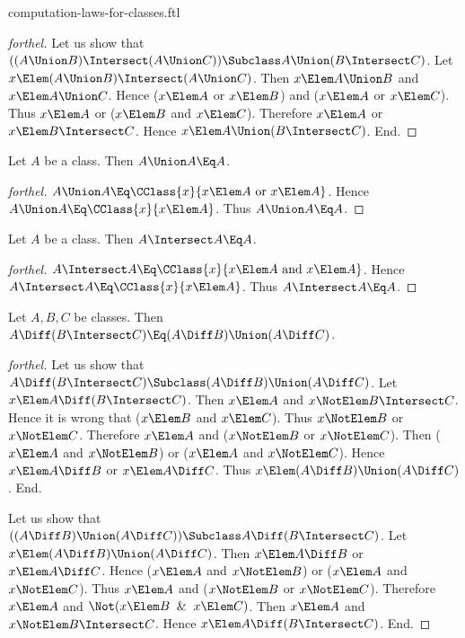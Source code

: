 \documentclass{stex}
\begin{document}
\begin{smodule}{computation-laws-for-classes.ftl}
\begin{proof}[forthel]
  Let us show that $((A \Union B) \Intersect (A \Union C)) \Subclass A \Union (B \Intersect C)$. %
    Let $x \Elem (A \Union B) \Intersect (A \Union C)$.
    Then $x \Elem A \Union B$ and $x \Elem A \Union C$.
    Hence ($x \Elem A$ or $x \Elem B$) and ($x \Elem A$ or $x \Elem C$).
    Thus $x \Elem A$ or ($x \Elem B$ and $x \Elem C$).
    Therefore $x \Elem A$ or $x \Elem B \Intersect C$.
    Hence $x \Elem A \Union (B \Intersect C)$.
  End.
\end{proof}

\begin{proposition*}[forthel]
  Let $A$ be a class.
  Then $A \Union A \Eq A$.
\end{proposition*}
\begin{proof}[forthel]
  $A \Union A \Eq \CClass{x}{x \Elem A\text{ or }x \Elem A}$.
  Hence $A \Union A \Eq \CClass{x}{x \Elem A}$.
  Thus $A \Union A \Eq A$.
\end{proof}

\begin{proposition*}[forthel]
  Let $A$ be a class.
  Then $A \Intersect A \Eq A$.
\end{proposition*}
\begin{proof}[forthel]
  $A \Intersect A \Eq \CClass{x}{x \Elem A\text{ and }x \Elem A}$.
  Hence $A \Intersect A \Eq \CClass{x}{x \Elem A}$.
  Thus $A \Intersect A \Eq A$.
\end{proof}

\begin{proposition*}[forthel]
  Let $A, B, C$ be classes.
  Then $A \Diff (B \Intersect C) \Eq (A \Diff B) \Union (A \Diff C)$.
\end{proposition*}
\begin{proof}[forthel]
  Let us show that $A \Diff (B \Intersect C) \Subclass (A \Diff B) \Union (A \Diff C)$.
    Let $x \Elem A \Diff (B \Intersect C)$.
    Then $x \Elem A$ and $x \NotElem B \Intersect C$.
    Hence it is wrong that ($x \Elem B$ and $x \Elem C$).
    Thus $x \NotElem B$ or $x \NotElem C$.
    Therefore $x \Elem A$ and ($x \NotElem B$ or $x \NotElem C$).
    Then ($x \Elem A$ and $x \NotElem B$) or ($x \Elem A$ and $x \NotElem C$).
    Hence $x \Elem A \Diff B$ or $x \Elem A \Diff C$.
    Thus $x \Elem (A \Diff B) \Union (A \Diff C)$.
  End.

  Let us show that $((A \Diff B) \Union (A \Diff C)) \Subclass A \Diff (B \Intersect C)$. %
    Let $x \Elem (A \Diff B) \Union (A \Diff C)$.
    Then $x \Elem A \Diff B$ or $x \Elem A \Diff C$.
    Hence ($x \Elem A$ and $x \NotElem B$) or ($x \Elem A$ and $x \NotElem C$).
    Thus $x \Elem A$ and ($x \NotElem B$ or $x \NotElem C$).
    Therefore $x \Elem A$ and $\Not(x \Elem B \And x \Elem C)$.
    Then $x \Elem A$ and $x \NotElem B \Intersect C$.
    Hence $x \Elem A \Diff (B \Intersect C)$.
  End.
\end{proof}


\end{smodule}
\end{document}
